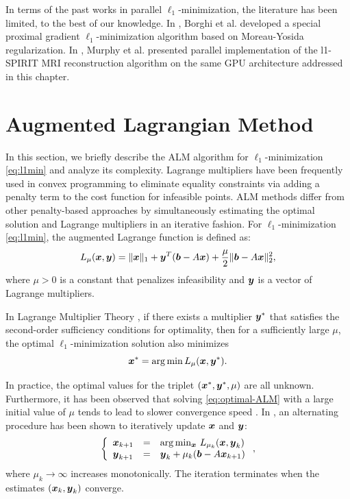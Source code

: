 In terms of the past works in parallel $\ell_1$-minimization, the literature has been
limited, to the best of our knowledge. In \cite{BorghiA2010}, Borghi et al.
developed a special proximal gradient $\ell_1$-minimization algorithm based on
Moreau-Yosida regularization. In \cite{MurphyM2010}, Murphy et al. presented
parallel implementation of the l1-SPIRIT MRI reconstruction algorithm on 
the same GPU architecture addressed in this chapter.

\section{Augmented Lagrangian Method}
\label{sec:ALM}
In this section, we briefly describe the ALM algorithm for $\ell_1$-minimization
\eqref{eq:l1min} \cite{YangA2010-ICIP} and analyze its complexity. Lagrange
multipliers have been frequently used in convex programming to eliminate
equality constraints via adding a penalty term to the cost function for
infeasible points. ALM methods differ from other penalty-based approaches by
simultaneously estimating the optimal solution and Lagrange multipliers in an
iterative fashion.  For $\ell_1$-minimization \eqref{eq:l1min}, the augmented Lagrange
function is defined as: 
\begin{equation} L_\mu({\boldsymbol{x}},{\boldsymbol{y}}) = \|{\boldsymbol{x}}\|_1 +
{\boldsymbol{y}}^T(\boldsymbol{b} - A{\boldsymbol{x}}) + \frac{\mu}{2} \| \boldsymbol{b}-A{\boldsymbol{x}} \|_2^2, 
\end{equation}
where $\mu > 0$ is a constant that penalizes infeasibility and ${\boldsymbol{y}}$ is a
vector of Lagrange multipliers.

In Lagrange Multiplier Theory \cite{BertsekasD2003}, if there exists a multiplier ${\boldsymbol{y}}^*$ that
satisfies the second-order sufficiency conditions for optimality, then for a sufficiently large $\mu$, the optimal
$\ell_1$-minimization solution also minimizes
\begin{equation}
{\boldsymbol{x}}^* = \arg \min L_\mu({\boldsymbol{x}},{\boldsymbol{y}}^*).
\label{eq:optimal-ALM}
\end{equation}

In practice, the optimal values for the triplet $({\boldsymbol{x}}^*, {\boldsymbol{y}}^*, \mu)$ are all
unknown. Furthermore, it has been observed that solving
\eqref{eq:optimal-ALM} with a large initial value of $\mu$ tends to lead to
slower convergence speed \cite{WrightS2008,YangA2010-ICIP}. In
\cite{BertsekasD2003,YangJ2009}, an alternating procedure has been shown to
iteratively update ${\boldsymbol{x}}$ and ${\boldsymbol{y}}$:
\begin{equation}
\left \{
\begin{array}{lll}
{\boldsymbol{x}}_{k+1} & = & \arg\min_{{\boldsymbol{x}}} \, L_{\mu_k} ({\boldsymbol{x}},{\boldsymbol{y}}_k)\\
{\boldsymbol{y}}_{k+1} & = & {\boldsymbol{y}}_k + \mu_k (\boldsymbol{b} - A{\boldsymbol{x}}_{k+1}) \\
\end{array}
\right . ,
\label{eq:alm}
\end{equation}
where $\mu_{k}\rightarrow \infty$ increases monotonically.
The iteration terminates when the estimates $({\boldsymbol{x}}_k, {\boldsymbol{y}}_k)$ converge.

